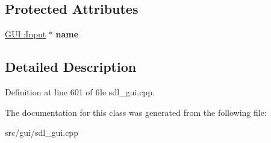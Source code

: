 \subsection*{Protected Attributes}
\begin{DoxyCompactItemize}
\item 
\hypertarget{classSetCycles_a3b066e0f197b6032acc4f53fa54ad118}{\hyperlink{classGUI_1_1Input}{G\-U\-I\-::\-Input} $\ast$ {\bfseries name}}\label{classSetCycles_a3b066e0f197b6032acc4f53fa54ad118}

\end{DoxyCompactItemize}


\subsection{Detailed Description}


Definition at line 601 of file sdl\-\_\-gui.\-cpp.



The documentation for this class was generated from the following file\-:\begin{DoxyCompactItemize}
\item 
src/gui/sdl\-\_\-gui.\-cpp\end{DoxyCompactItemize}
